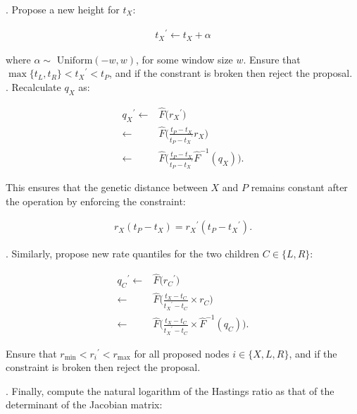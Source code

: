 \documentclass[12pt]{article}
\begin{document}
. Propose a new height for $t_X$:

\begin{align}
	{t_X}^\prime \leftarrow t_X + \alpha
\end{align}

where $\alpha \sim \text{ Uniform}(-w, w)$, for some window size $w$. Ensure that $\max\{t_L, t_R \} < {t_X}^\prime < t_P$, and if the constrant is broken then reject the proposal.  \\


. Recalculate $q_X$ as:



\begin{align}
	{q_X}^\prime  \leftarrow & \hat{F}\Big({r_X}^\prime \Big) \nonumber\\
				\leftarrow & \hat{F}\Big(\frac{t_P - t_X}{t_P - {t_X}^\prime} r_X \Big)\nonumber \\
				\leftarrow & \hat{F}\Big(\frac{t_P - t_X}{t_P - {t_X}^\prime} \hat{F}^{-1}(q_X) \Big).
\end{align}


This ensures that the genetic distance between $X$ and $P$ remains constant after the operation by enforcing the constraint:


\begin{align}
	r_X (t_P - t_X) = {r_X}^\prime (t_P - {t_X}^\prime).
\end{align}




. Similarly, propose new rate quantiles for the two children $C \in \{L, R\}$:



\begin{align}
	{q_C}^\prime  \leftarrow & \hat{F}\Big({r_C}^\prime \Big) \nonumber\\
				\leftarrow & \hat{F}\Big(\frac{t_X - t_C}{{t_X}^\prime - t_C} \times r_C \Big) \nonumber\\
				\leftarrow & \hat{F}\Big(\frac{t_X - t_C}{{t_X}^\prime - t_C} \times \hat{F}^{-1}(q_C) \Big).
\end{align}


Ensure that $r_\text{min} < {r_i}^\prime < r_\text{max}$ for all proposed nodes $i \in \{X, L, R\}$, and if the constraint is broken then reject the proposal. 





. Finally, compute the natural logarithm of the Hastings ratio as that of the determinant of the Jacobian matrix:
\end{document}
